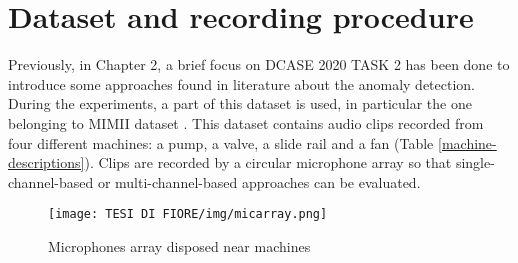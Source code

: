\section{Dataset and recording procedure}
Previously, in Chapter 2, a brief focus on DCASE 2020 TASK 2 has been done to introduce some approaches found in literature about the anomaly detection. During the experiments, a part of this dataset is used, in particular the one belonging to MIMII dataset \cite{20MIMIIDataset}.
This dataset contains audio clips recorded from four different machines: a pump, a valve, a slide rail and a fan (Table \ref{machine-descriptions}). Clips are recorded by a circular microphone array so that single-channel-based or multi-channel-based approaches can be evaluated.
\begin{figure}[ht]
\texttt{[image: TESI DI FIORE/img/micarray.png]}
\centering
\caption{Microphones array disposed near machines \cite{DCASE}}
\label{micarray}
\end{figure}
